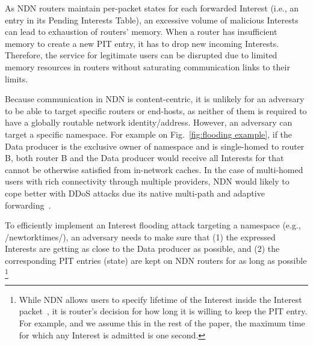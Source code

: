 As NDN routers maintain per-packet states for each forwarded Interest (i.e., an entry in its Pending Interests Table), an excessive volume of malicious Interests can lead to exhaustion of routers' memory. When a router has insufficient memory to create a new PIT entry, it has to drop new incoming Interests.
Therefore, the service for legitimate users can be disrupted due to limited memory resources in routers without saturating communication links to their limits.


Because communication in NDN is content-centric, it is unlikely for an adversary to be able to target specific routers or end-hosts, as neither of them is required to have a globally routable network identity/address. However, an adversary can target a specific namespace.
For example on Fig.~\ref{fig:flooding example}, if the Data producer is the exclusive owner of  namespace and is single-homed to router B, both router B and the Data producer would receive all Interests for  that cannot be otherwise satisfied from in-network caches. In the case of multi-homed users with rich connectivity through multiple providers, NDN would likely to cope better with DDoS attacks due its native multi-path and adaptive forwarding~\cite{adaptive-forwarding}.



To efficiently implement an Interest flooding attack targeting a namespace (e.g., /newtorktimes/), an adversary needs to make sure that (1) the expressed Interests are getting as close to the Data producer as possible, and (2) the corresponding PIT entries (state) are kept on NDN routers for as long as possible \footnote{While NDN allows users to specify lifetime of the Interest inside the Interest packet~\cite{ndn-conext,ndn-tr}, it is router's decision for how long it is willing to keep the PIT entry.  For example, and we assume this in the rest of the paper, the maximum time for which any Interest is admitted is one second.}

